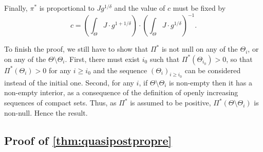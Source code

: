Finally, $\pi^\ast$ is proportional to $Jg^{1/\delta}$ and the value of $c$ must be fixed by
\begin{equation}
    c = \left(\int_\Theta J\cdot g^{1+1/\delta}\right)\cdot\left(\int_\Theta J\cdot g^{1/\delta}\right)^{-1}.
\end{equation}

To finish the proof, we still have to show that $\varPi^\ast$ is not null on any of the $\Theta_i$, or on any of the $\Theta\setminus\Theta_i$. First, there must exist $i_0$ such that $\varPi^\ast(\Theta_{i_0})>0$, so that $\varPi^\ast(\Theta_i)>0$ for any $i\geq i_0$ and the sequence $(\Theta_i)_{i\geq i_0}$ can be considered instead of the initial one. Second, for any $i$, if $\Theta\setminus\Theta_i$ is non-empty then it has a non-empty interior, as a consequence of the definition of openly increasing sequences of compact sets. Thus, as $\varPi^\ast$ is assumed to be positive, $\varPi^\ast(\Theta\setminus\Theta_i)$ is non-null. Hence the result.



\subsection{Proof of \cref{thm:quasipostpropre}}

